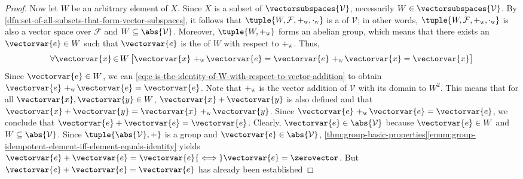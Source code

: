 \begin{proof}
    \vspace{0.3cm}
    \noindent
    Now let \( W \) be an arbitrary element of \( X \). Since \( X \) is a subset of \( \vectorsubspaces{\mathcal{V}} \),
    necessarily \( W \in \vectorsubspaces{\mathcal{V}} \). By \cref{dfn:set-of-all-subsets-that-form-vector-subspaces},
    it follows that \( \tuple{W, \mathcal{F}, \smallsubscript{+}{W}, \smallsubscript{\cdot}{W} } \)
    is a  of \( \mathcal{V} \);
    in other words, \( \tuple{W, \mathcal{F}, \smallsubscript{+}{W}, \smallsubscript{\cdot}{W} } \)
    is also a vector space over \( \mathcal{F} \) and \( W \subseteq \abs{\mathcal{V}} \). Moreover, \( \tuple{W, \smallsubscript{+}{W} } \)
    forms an abelian group, which means that there exists an \( \vectorvar{e} \in W \) such that \( \vectorvar{e} \) is the
     of \( W \) with respect to \( \smallsubscript{+}{W} \). Thus,
    \begin{equation}
        \label{eq:e-is-the-identity-of-W-with-respect-to-vector-addition}
        \forall \vectorvar{x}\,{\in}\,W \, \big[ \vectorvar{x} \,\, \smallsubscript{+}{W} \,
        \vectorvar{e} = \vectorvar{e} \,\,\smallsubscript{+}{W} \, \vectorvar{x} = \vectorvar{x}  \big]
    \end{equation}
    Since \( \vectorvar{e} \in W \), we can 
    \eqref{eq:e-is-the-identity-of-W-with-respect-to-vector-addition} to obtain \( \vectorvar{e} \,\, \smallsubscript{+}{W}\, \vectorvar{e} = \vectorvar{e} \).
    Note that \( \smallsubscript{+}{W} \) is the vector addition of \( \mathcal{V} \) with its domain  to \( W^{2} \).
    This means that for all \( \vectorvar{x}, \vectorvar{y} \in W \), \( \vectorvar{x} + \vectorvar{y} \) is also defined and that
    \( \vectorvar{x} + \vectorvar{y} = \vectorvar{x} \,\, \smallsubscript{+}{W} \, \vectorvar{y} \).
    Since \( \vectorvar{e} \,\, \smallsubscript{+}{W} \, \vectorvar{e} = \vectorvar{e} \), we conclude that \( \vectorvar{e} + \vectorvar{e} = \vectorvar{e} \).
    Clearly, \( \vectorvar{e} \in \abs{\mathcal{V}} \) because \( \vectorvar{e} \in W \) and \( W \subseteq \abs{\mathcal{V}} \).
    Since \( \tuple{\abs{\mathcal{V}}, +} \) is a group and \( \vectorvar{e} \in \abs{\mathcal{V}} \), 
    \cref{thm:group-basic-properties}\ref{enum:group-idempotent-element-iff-element-equals-identity} yields
    \( \vectorvar{e} + \vectorvar{e} = \vectorvar{e} {\iff} \vectorvar{e} = \zerovector \). But \( \vectorvar{e} + \vectorvar{e} = \vectorvar{e} \) has already been established

\end{proof}
